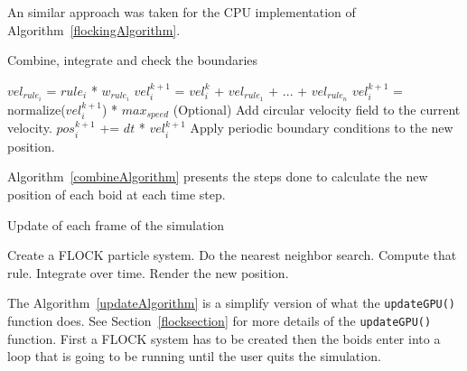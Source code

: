 An similar approach was taken for the CPU implementation of Algorithm~\ref{flockingAlgorithm}.

\begin{algorithm}
\caption{Combine, integrate and check the boundaries}
\label{combineAlgorithm}
\begin{algorithmic}
\STATE $vel_{rule_i}$  = $rule_i$ * $w_{rule_i}$ 
\STATE $vel_i^{k+1}$ = $vel_i^k$ + $vel_{rule_1}$ + ... + $vel_{rule_n}$
	\STATE $vel_i^{k+1}$ = normalize($vel_i^{k+1}$) * $max_{speed}$
\ENDIF  
\STATE (Optional) Add circular velocity field to the current velocity.
\STATE $pos_i^{k+1}$ += $dt$ * $vel_i^{k+1}$
\STATE Apply periodic boundary conditions to the new position.
\end{algorithmic}
\end{algorithm}

Algorithm~\ref{combineAlgorithm} presents the steps done to calculate the new position of each boid at each time step.

\begin{algorithm}
\caption{Update of each frame of the simulation}
\label{updateAlgorithm}
\begin{algorithmic}
\STATE Create a FLOCK particle system.
\STATE Do the nearest neighbor search.
\STATE Compute that rule.
\STATE Integrate over time.
\STATE Render the new position.
\ENDFOR
\end{algorithmic}
\end{algorithm}

The Algorithm~\ref{updateAlgorithm} is a simplify version of what the \texttt{updateGPU()} function does. See Section~\ref{flocksection} for more details of the \texttt{updateGPU()} function. First a FLOCK system has to be created then the boids enter into a loop that is going to be running until the user quits the simulation.

